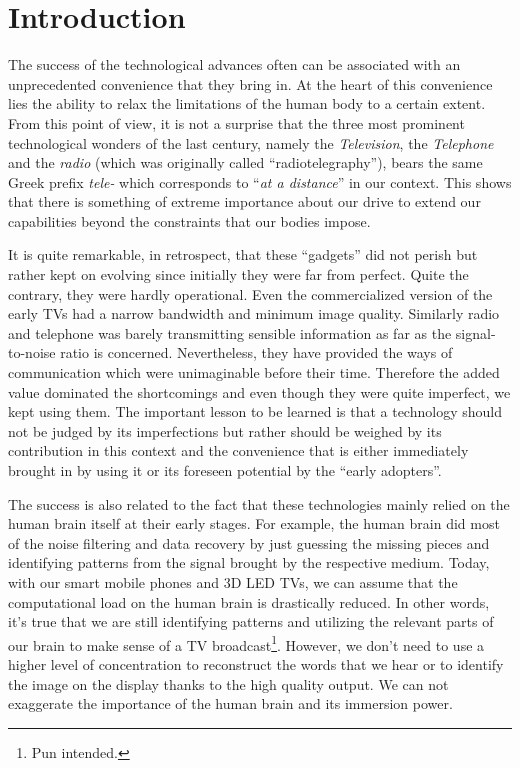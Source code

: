 
\chapter{Introduction}
\label{chap:intro}

The success of the technological advances often can be associated with an unprecedented convenience that they bring in. At the heart of this convenience lies the ability to relax the limitations of the human body to a certain extent. From this point of view, it is not a surprise that the three most prominent technological wonders of the last century, namely the \emph{Television}, the \emph{Telephone} and the \emph{radio} (which was originally called \enquote{radiotelegraphy}), bears the same Greek prefix \emph{tele-} which corresponds to \enquote{\emph{at a distance}} in our context. This shows that there is something of extreme importance about our drive to extend our capabilities beyond the constraints that our bodies impose.


It is quite remarkable, in retrospect, that these \enquote{gadgets} did not perish but rather kept on evolving since initially they were far from perfect. Quite the contrary, they were hardly operational. Even the commercialized version of the early TVs had a narrow bandwidth and minimum image quality. Similarly radio and telephone was barely transmitting sensible information as far as the signal-to-noise ratio is concerned. Nevertheless, they have provided the ways of communication which were unimaginable before their time. Therefore the added value dominated the shortcomings and even though they were quite imperfect, we kept using them. The important lesson to be learned is that a technology should not be judged by its imperfections but rather should be weighed by its contribution in this context and the convenience that is either immediately brought in by using it or its foreseen potential by the \enquote{early adopters}.

The success is also related to the fact that these technologies mainly relied on the human brain itself at their early stages. For example, the human brain did most of the noise filtering and data recovery by just guessing the missing pieces and identifying patterns from the signal brought by the respective medium. Today, with our smart mobile phones and 3D LED TVs, we can assume that the computational load on the human brain is drastically reduced. In other words, it's true that we are still identifying patterns and utilizing the relevant parts of our brain to make sense of a TV broadcast\footnote{Pun intended.}. However, we don't need to use a higher level of concentration to reconstruct the words that we hear or to identify the image on the display thanks to the high quality output. We can not exaggerate the importance of the human brain and its immersion power. 

